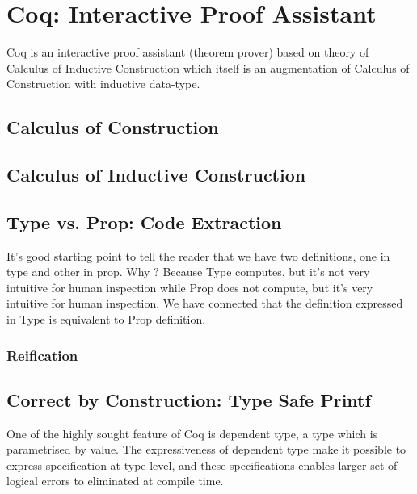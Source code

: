 \section{Coq: Interactive Proof Assistant}
\label{sec:problemstatement}
Coq  is an interactive proof assistant (theorem prover) based on
theory of Calculus of 
Inductive Construction \citep{Paulin-Mohring:1993:IDS:645891.671440} which itself is an 
augmentation of Calculus of Construction 
\citep{Coquand:1988:CC:47724.47725} with inductive data-type.  
 

\subsection{Calculus of Construction}
\label{sec:cc}
\subsection{Calculus of Inductive Construction}
\label{sec:cic}
 
 
\subsection{Type vs. Prop: Code Extraction}
\label{sec:typeprop}
  It's good starting point to tell the reader that we have two definitions, 
  one in type and other in prop. Why ? Because Type computes, but it's
  not very intuitive for human inspection while Prop does not compute, 
  but it's very intuitive for human inspection. We have connected that 
  the definition expressed in Type is equivalent to Prop definition. 
  
  \subsubsection{Reification}
  \label{sec:reification}
    
 \subsection{Correct by Construction: Type Safe Printf}
 \label{sec:deplambda}
  One of the highly sought feature of Coq is dependent type, 
  a type which is parametrised by value.  
  The expressiveness of dependent type make it possible
  to express specification at type level, and these specifications enables larger 
  set of  logical errors to eliminated at compile time. 
  
